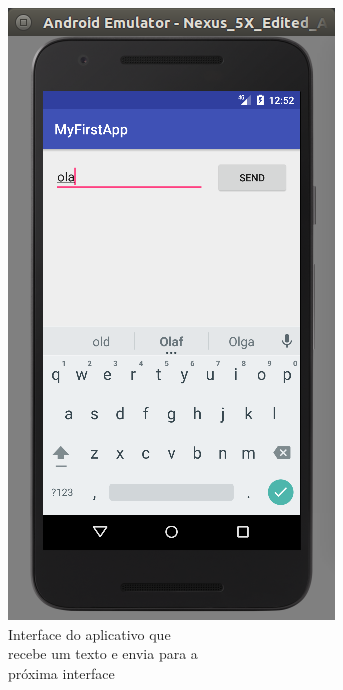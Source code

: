 \documentclass[hidelinks,12pt]{article}
\begin{document}
\begin{figure}[H]
	\begin{subfigure}{0.5\textwidth}
		\includegraphics[scale=0.5]{hw_message} 
		\caption{Interface do aplicativo que\\\hspace{\textwidth}recebe um texto e envia para a \\\hspace{\textwidth}pr\'oxima interface}
		\label{hw_message}
	\end{subfigure}
	\begin{subfigure}{0.5\textwidth}

\end{subfigure}
\end{figure}
\end{document}
